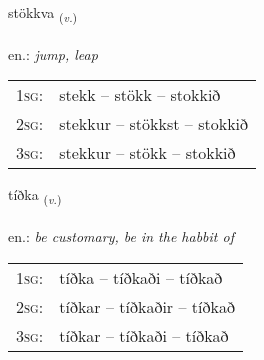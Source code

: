 \documentclass[frontgrid, backgrid]{flacards}\usepackage[]{graphicx}\usepackage[]{xcolor}
\begin{document}
\renewcommand{\flhead}{\vskip5pt \fboxsep=0pt {\small\bfseries\footnotesize Sagnorð | Verb}}
\renewcommand{\fcfoot}{\vskip5pt \fboxsep=0pt \hspace{2pt}{\small\bfseries\footnotesize 2K}}

\renewcommand{\blhead}{\vskip5pt {\small\bfseries\footnotesize Sagnorð | Verb }}
\renewcommand{\bcfoot}{\vskip5pt \hspace{2pt}{\small\bfseries\footnotesize 2K}}


{stökkva \small{\textsubscript{(\textit{v.})}} \\[1ex] %
\textphonetic{[stœhkva]} \\
en.: \emph{jump, leap} \\  [2ex]
\renewcommand*{\arraystretch}{0.8}
\begin{tabular}{p{1cm}l}
\textsc{1sg}: & stekk -- stökk -- stokkið \\ 
\textsc{2sg}: & stekkur -- stökkst -- stokkið \\ 
\textsc{3sg}: & stekkur -- stökk -- stokkið \\ 
\end{tabular}
}

\renewcommand{\flhead}{\vskip5pt \fboxsep=0pt {\small\bfseries\footnotesize Sagnorð | Verb}}
\renewcommand{\fcfoot}{\vskip5pt \fboxsep=0pt \hspace{2pt}{\small\bfseries\footnotesize 2K}}

\renewcommand{\blhead}{\vskip5pt {\small\bfseries\footnotesize Sagnorð | Verb }}
\renewcommand{\bcfoot}{\vskip5pt \hspace{2pt}{\small\bfseries\footnotesize 2K}}


{tíðka \small{\textsubscript{(\textit{v.})}} \\[1ex] %
\textphonetic{[tʰiθka]} \\
en.: \emph{be customary, be in the habbit of} \\  [2ex]
\renewcommand*{\arraystretch}{0.8}
\begin{tabular}{p{1cm}l}
\textsc{1sg}: & tíðka -- tíðkaði -- tíðkað \\ 
\textsc{2sg}: & tíðkar -- tíðkaðir -- tíðkað \\ 
\textsc{3sg}: & tíðkar -- tíðkaði -- tíðkað \\ 
\end{tabular}
}
\end{document}
